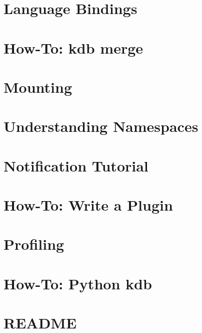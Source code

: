 \documentclass[twoside]{book}
\newcommand{\+}{\discretionary{\mbox{\scriptsize$\hookleftarrow$}}{}{}}
\begin{document}
\chapter{Language Bindings}
\label{doc_tutorials_language-bindings_md}

\chapter{How-\/\+To\+: kdb merge}
\label{doc_tutorials_merge_md}

\chapter{Mounting}
\label{doc_tutorials_mount_md}

\chapter{Understanding Namespaces}
\label{doc_tutorials_namespaces_md}

\chapter{Notification Tutorial}
\label{doc_tutorials_notifications_md}

\chapter{How-\/\+To\+: Write a Plugin}
\label{doc_tutorials_plugins_md}

\chapter{Profiling}
\label{doc_tutorials_profiling_md}

\chapter{How-\/\+To\+: Python kdb}
\label{doc_tutorials_python-kdb_md}

\chapter{R\+E\+A\+D\+ME}
\label{md_doc_tutorials_README}

\end{document}
